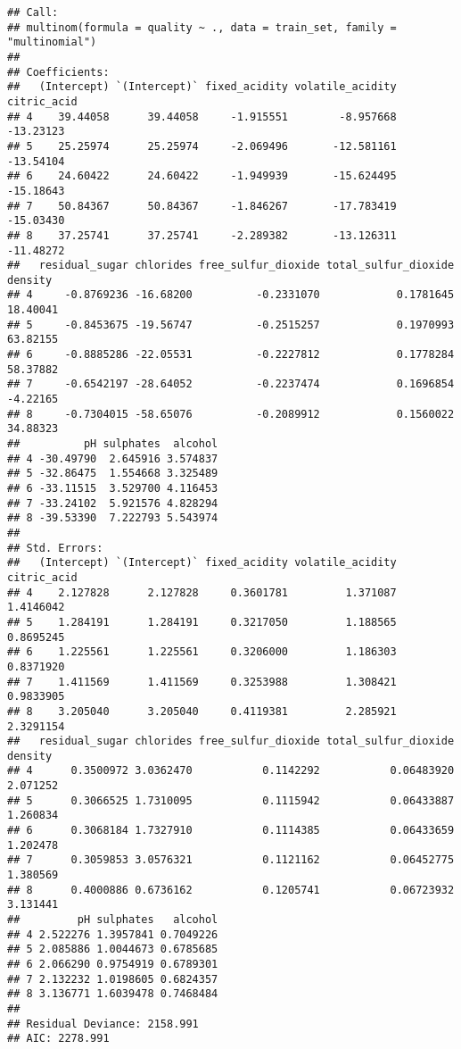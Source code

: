 \documentclass{article}
\begin{document}
\begin{verbatim}
## Call:
## multinom(formula = quality ~ ., data = train_set, family = "multinomial")
## 
## Coefficients:
##   (Intercept) `(Intercept)` fixed_acidity volatile_acidity citric_acid
## 4    39.44058      39.44058     -1.915551        -8.957668   -13.23123
## 5    25.25974      25.25974     -2.069496       -12.581161   -13.54104
## 6    24.60422      24.60422     -1.949939       -15.624495   -15.18643
## 7    50.84367      50.84367     -1.846267       -17.783419   -15.03430
## 8    37.25741      37.25741     -2.289382       -13.126311   -11.48272
##   residual_sugar chlorides free_sulfur_dioxide total_sulfur_dioxide  density
## 4     -0.8769236 -16.68200          -0.2331070            0.1781645 18.40041
## 5     -0.8453675 -19.56747          -0.2515257            0.1970993 63.82155
## 6     -0.8885286 -22.05531          -0.2227812            0.1778284 58.37882
## 7     -0.6542197 -28.64052          -0.2237474            0.1696854 -4.22165
## 8     -0.7304015 -58.65076          -0.2089912            0.1560022 34.88323
##          pH sulphates  alcohol
## 4 -30.49790  2.645916 3.574837
## 5 -32.86475  1.554668 3.325489
## 6 -33.11515  3.529700 4.116453
## 7 -33.24102  5.921576 4.828294
## 8 -39.53390  7.222793 5.543974
## 
## Std. Errors:
##   (Intercept) `(Intercept)` fixed_acidity volatile_acidity citric_acid
## 4    2.127828      2.127828     0.3601781         1.371087   1.4146042
## 5    1.284191      1.284191     0.3217050         1.188565   0.8695245
## 6    1.225561      1.225561     0.3206000         1.186303   0.8371920
## 7    1.411569      1.411569     0.3253988         1.308421   0.9833905
## 8    3.205040      3.205040     0.4119381         2.285921   2.3291154
##   residual_sugar chlorides free_sulfur_dioxide total_sulfur_dioxide  density
## 4      0.3500972 3.0362470           0.1142292           0.06483920 2.071252
## 5      0.3066525 1.7310095           0.1115942           0.06433887 1.260834
## 6      0.3068184 1.7327910           0.1114385           0.06433659 1.202478
## 7      0.3059853 3.0576321           0.1121162           0.06452775 1.380569
## 8      0.4000886 0.6736162           0.1205741           0.06723932 3.131441
##         pH sulphates   alcohol
## 4 2.522276 1.3957841 0.7049226
## 5 2.085886 1.0044673 0.6785685
## 6 2.066290 0.9754919 0.6789301
## 7 2.132232 1.0198605 0.6824357
## 8 3.136771 1.6039478 0.7468484
## 
## Residual Deviance: 2158.991 
## AIC: 2278.991
\end{verbatim}
\end{document}
